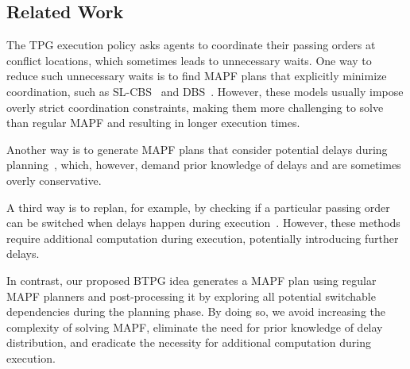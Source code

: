 \documentclass[letterpaper]{article} %
\theoremstyle{definition}
\newcommand{\rishi}[1]{\textcolor{black}{\textbf{Rishi:}}
\textcolor{purple}{#1}}
\newcommand{\andrew}[1]{\textcolor{black}{\textbf{Yifan:}} \textcolor{blue}{#1}}
\begin{document}
\subsection{Related Work}

The TPG execution policy asks agents to coordinate their passing orders at conflict locations, which sometimes leads to unnecessary waits.
One way to reduce such unnecessary waits is to find MAPF plans that explicitly minimize coordination, such as SL-CBS~\cite{wagner_minimizing_2022} and DBS~\cite{okumura_offline_2023}. However, these models usually impose overly strict coordination constraints, making them more challenging to solve than regular MAPF and resulting in longer execution times.

Another way is to generate MAPF plans that consider potential delays during planning~\cite{ma_multi-agent_2017, atzmon_robust_2021}, which, however, demand prior knowledge of delays and are sometimes overly conservative.

A third way is to replan, for example, by checking if a particular passing order can be switched when delays happen during execution~\cite{berndt_feedback_2020,paul_fast_2023,pecora_loosely-coupled_2018,coskun_deadlock-free_2021}. However, these methods require additional computation during execution, potentially introducing further delays.

In contrast, our proposed BTPG idea generates a MAPF plan using regular MAPF planners and post-processing it by exploring all potential switchable dependencies during the planning phase. By doing so, we avoid increasing the complexity of solving MAPF, eliminate the need for prior knowledge of delay distribution, and eradicate the necessity for additional computation during execution.

\end{document}

